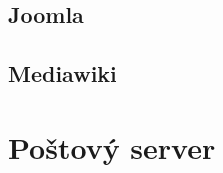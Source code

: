 \paragraph{}

\subsection{Joomla}
\paragraph{}

\subsection{Mediawiki}
\paragraph{}

\section{Poštový server}
\paragraph{}

